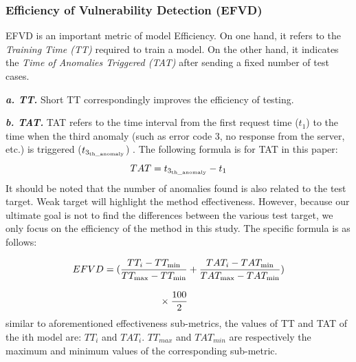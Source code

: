 \subsubsection{\textbf{Efficiency of Vulnerability Detection (EFVD)}}
EFVD is an important metric of model Efficiency. On one hand, it refers to the \textit{Training Time (TT)} required to train a model. On the other hand, it indicates the \textit{Time of Anomalies Triggered (TAT)} after sending a fixed number of test cases. 

\quad \textit{\textbf{a. TT.}} Short TT correspondingly improves the efficiency of testing.

\quad \textit{\textbf{b. TAT.}} TAT refers to the time interval from the first request time (${t_1}$) to the time when the third anomaly (such as error code 3, no response from the server, etc.) is triggered (${t_{{3_{{\rm{th\_anomaly}}}}}}$) . The following formula is for TAT in this paper:
\begin{equation}
TAT={t_{{3_{{\rm{th\_anomaly}}}}}} - {t_1}  
\end{equation}
It should be noted that the number of anomalies found is also related to the test target. Weak target will highlight the method effectiveness. However, because our ultimate goal is not to find the differences between the various test target, we only focus on the efficiency of the method in this study. The specific formula is as follows:

\begin{equation}
\begin{array}{l}
EFVD=(\displaystyle\frac{{T{T_i} - T{T_{\min }}}}{{T{T_{\max }} - T{T_{\min }}}} + \frac{{TA{T_i} - TA{T_{\min }}}}{{TA{T_{\max }} - TA{T_{\min }}}})\\
\\{\kern 1pt} {\kern 1pt} {\kern 1pt} {\kern 1pt} {\kern 1pt} {\kern 1pt} {\kern 1pt} {\kern 1pt} {\kern 1pt} {\kern 1pt} {\kern 1pt} {\kern 1pt} {\kern 1pt} {\kern 1pt} {\kern 1pt} {\kern 1pt} {\kern 1pt} {\kern 1pt} {\kern 1pt} {\kern 1pt} {\kern 1pt} {\kern 1pt} {\kern 1pt} {\kern 1pt} {\kern 1pt} {\kern 1pt} {\kern 1pt} {\kern 1pt} {\kern 1pt} {\kern 1pt} {\kern 1pt} {\kern 1pt} {\kern 1pt} {\kern 1pt} {\kern 1pt} {\kern 1pt} {\kern 1pt} {\kern 1pt} {\kern 1pt} {\kern 1pt} {\kern 1pt} {\kern 1pt} {\kern 1pt} {\kern 1pt} {\kern 1pt} {\kern 1pt} {\kern 1pt} {\kern 1pt} {\kern 1pt} {\kern 1pt} {\kern 1pt} {\kern 1pt} {\kern 1pt} {\kern 1pt} {\kern 1pt} {\kern 1pt} {\kern 1pt} {\kern 1pt} {\kern 1pt} {\kern 1pt} {\kern 1pt} {\kern 1pt} {\kern 1pt} {\kern 1pt} {\kern 1pt} {\kern 1pt} {\kern 1pt} {\kern 1pt} {\kern 1pt} {\kern 1pt} {\kern 1pt} {\kern 1pt} {\kern 1pt} {\kern 1pt} {\kern 1pt} {\kern 1pt} {\kern 1pt} {\kern 1pt} {\kern 1pt} {\kern 1pt} {\kern 1pt} {\kern 1pt} {\kern 1pt} {\kern 1pt} {\kern 1pt} {\kern 1pt} {\kern 1pt}  {\kern 1pt} {\kern 1pt} {\kern 1pt}  
\times \displaystyle\frac{{100}}{2}{\kern 1pt}
\end{array}
\end{equation}
similar to aforementioned effectiveness sub-metrics, the values of TT and TAT of the ith model are: ${TT_i}$ and ${TAT_i}$. ${{TT}_{max}}$ and ${{TAT}_{min}}$ are respectively the maximum and minimum values of the corresponding sub-metric.

